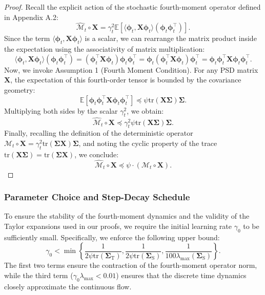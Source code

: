 \documentclass{article}
\theoremstyle{definition}
\theoremstyle{definition}
\theoremstyle{plain}
\theoremstyle{plain}
\theoremstyle{plain}
\theoremstyle{plain}
\theoremstyle{plain}
\newcommand{\bs}[1]{\boldsymbol{\mathbf{#1}}}
\newcommand{\tr}{\mathrm{tr}}
\newcommand{\te}{\mathrm{T}}
\newcommand{\st}{\mathrm{S}}
\begin{document}
\begin{proof}
    Recall the explicit action of the stochastic fourth-moment operator defined in Appendix A.2:
    \begin{equation}
        \widehat{\mathcal{M}}_t \circ \bs X = \gamma_t^2 \mathbb{E}[ \langle \bs \phi_t, \bs X \bs \phi_t \rangle (\bs \phi_t \bs \phi_t^\top) ].
    \end{equation}
    Since the term $\langle \bs \phi_t, \bs X \bs \phi_t \rangle$ is a scalar, we can rearrange the matrix product inside the expectation using the associativity of matrix multiplication:
    \begin{equation}
        \langle \bs \phi_t, \bs X \bs \phi_t \rangle (\bs \phi_t \bs \phi_t^\top) = (\bs \phi_t^\top \bs X \bs \phi_t) \bs \phi_t \bs \phi_t^\top = \bs \phi_t (\bs \phi_t^\top \bs X \bs \phi_t) \bs \phi_t^\top = \bs \phi_t \bs \phi_t^\top \bs X \bs \phi_t \bs \phi_t^\top.
    \end{equation}
    Now, we invoke Assumption 1 (Fourth Moment Condition). For any PSD matrix $\bs X$, the expectation of this fourth-order tensor is bounded by the covariance geometry:
    \begin{equation}
        \mathbb{E}[ \bs \phi_t \bs \phi_t^\top \bs X \bs \phi_t \bs \phi_t^\top ] \preceq \psi \tr(\bs X \bs \Sigma) \bs \Sigma.
    \end{equation}
    Multiplying both sides by the scalar $\gamma_t^2$, we obtain:
    \begin{equation}
        \widehat{\mathcal{M}}_t \circ \bs X \preceq \gamma_t^2 \psi \tr(\bs X \bs \Sigma) \bs \Sigma.
    \end{equation}
    Finally, recalling the definition of the deterministic operator $\mathcal{M}_t \circ \bs X = \gamma_t^2 \tr(\bs \Sigma \bs X) \bs \Sigma$, and noting the cyclic property of the trace $\tr(\bs X \bs \Sigma) = \tr(\bs \Sigma \bs X)$, we conclude:
    \begin{equation}
        \widehat{\mathcal{M}}_t \circ \bs X \preceq \psi \cdot (\mathcal{M}_t \circ \bs X).
    \end{equation}
\end{proof}

\subsubsection{Parameter Choice and Step-Decay Schedule}
\label{sec:parameter_choice}

To ensure the stability of the fourth-moment dynamics and the validity of the Taylor expansions used in our proofs, we require the initial learning rate $\gamma_0$ to be sufficiently small. Specifically, we enforce the following upper bound:
\begin{equation}
    \gamma_0 < \min\left\{\frac{1}{2\psi\tr(\bs\Sigma_\te)},\frac{1}{2\psi\tr(\bs\Sigma_\st)},\frac{1}{100\lambda_{\max}(\bs\Sigma_\st)}\right\}.
\end{equation}
The first two terms ensure the contraction of the fourth-moment operator norm, while the third term ($\gamma_0 \lambda_{\max} < 0.01$) ensures that the discrete time dynamics closely approximate the continuous flow.
\end{document}
